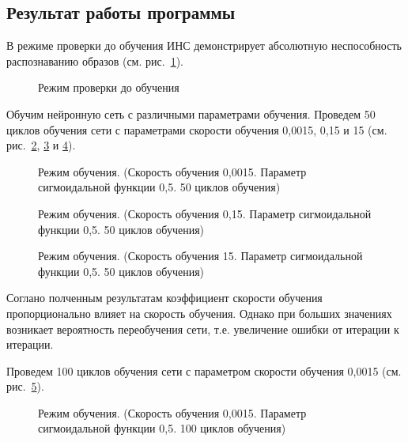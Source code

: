\subsection{Результат работы программы}


В режиме проверки  до обучения ИНС демонстрирует абсолютную неспособность распознаванию образов (см. рис.~\ref{ris:Check}).

\begin{figure}[h]
\caption{Режим проверки до обучения}
\label{ris:Check}
\end{figure}

Обучим нейронную сеть с различными параметрами обучения.
Проведем 50 циклов обучения сети с параметрами скорости обучения 0,0015, 0,15 и 15 (см. рис.~\ref{ris:stud_0,0015_0,5_50}, \ref{ris:stud_0,15_0,5_50} и \ref{ris:stud_15_0,5_50}).

\begin{figure}[H]
\caption{Режим обучения. (Скорость обучения 0,0015. Параметр сигмоидальной функции 0,5. 50 циклов обучения)}
\label{ris:stud_0,0015_0,5_50}
\end{figure}

\begin{figure}[H]
\caption{Режим обучения. (Скорость обучения 0,15. Параметр сигмоидальной функции 0,5. 50 циклов обучения)}
\label{ris:stud_0,15_0,5_50}
\end{figure}

\begin{figure}[H]
\caption{Режим обучения. (Скорость обучения 15. Параметр сигмоидальной функции 0,5. 50 циклов обучения)}
\label{ris:stud_15_0,5_50}
\end{figure}

Соглано полченным результатам коэффициент скорости обучения пропорционально влияет на скорость обучения. 
Однако при больших значениях возникает вероятность переобучения сети, т.е. увеличение ошибки от итерации к итерации.


Проведем 100 циклов обучения сети с параметром скорости обучения 0,0015 (см. рис.~\ref{ris:stud_0,0015_0,5_100}).

\begin{figure}[h]
\caption{Режим обучения. (Скорость обучения 0,0015. Параметр сигмоидальной функции 0,5. 100 циклов обучения)}
\label{ris:stud_0,0015_0,5_100}
\end{figure}

